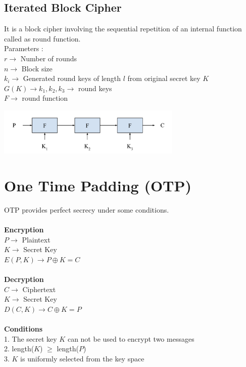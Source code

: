 \documentclass[11pt]{article}
\begin{document}
\subsection*{Iterated Block Cipher}
It is a block cipher involving the sequential repetition of an internal function called as round function. \\
Parameters : \\
$ r \rightarrow$ Number of rounds \\
$ n \rightarrow$ Block size \\
$ k_i \rightarrow$ Generated round keys of length $l$ from original secret key $K$\\
$G(K) \rightarrow k_1 , k_2 , k_3 \rightarrow$ round keys \\
$F \rightarrow$ round function \\
\begin{center}
\includegraphics[width=250pt]{p5.png}
\end{center}

\section*{One Time Padding (OTP)}
OTP provides perfect secrecy under some conditions. \\ \\
\textbf{Encryption} \\
$ P \rightarrow$ Plaintext \\
$ K \rightarrow$ Secret Key \\
$ E(P,K) \rightarrow P \oplus K = C$ \\ \\
\textbf{Decryption} \\
$ C \rightarrow$ Ciphertext \\
$ K \rightarrow$ Secret Key \\
$ D(C,K) \rightarrow C \oplus K = P$ \\ \\
\textbf{Conditions}\\
1. The secret key $K$ can not be used to encrypt two messages \\
2. length($K$) $\geq$ length($P$) \\
3. $K$ is uniformly selected from the key space \\
\end{document}
